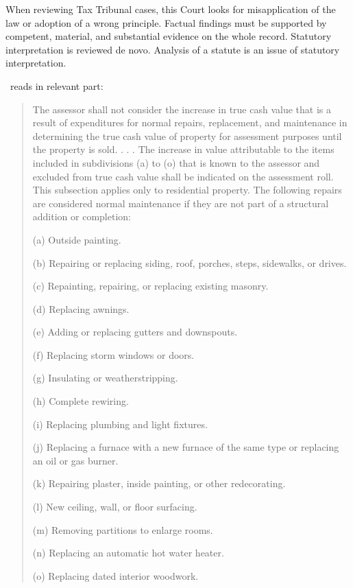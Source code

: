 \documentclass[12pt,\documentclassflag]{michiganCourtOfAppealsBrief}
\def\mathieuGast{\pincite[l]{MCL}{211.27(2)}}
\begin{document}
When reviewing Tax Tribunal cases, this Court looks for misapplication of the law or adoption of a wrong principle. Factual findings must be supported by competent, material, and substantial evidence on the whole record. Statutory interpretation is reviewed de novo.  Analysis of a statute is an issue of statutory interpretation.

\mathieuGast\ reads in relevant part:

\begin{quote}
  The assessor shall not consider the increase in true cash value that is a result of expenditures for normal repairs, replacement, and maintenance in determining the true cash value of property for assessment purposes until the property is sold. . . . The increase in value attributable to the items included in subdivisions (a) to (o) that is known to the assessor and excluded from true cash value shall be indicated on the assessment roll. This subsection applies only to residential property. The following repairs are considered normal maintenance if they are not part of a structural addition or completion:

  (a) Outside painting.

  (b) Repairing or replacing siding, roof, porches, steps, sidewalks, or drives.

  (c) Repainting, repairing, or replacing existing masonry.

  (d) Replacing awnings.

  (e) Adding or replacing gutters and downspouts.

  (f) Replacing storm windows or doors.

  (g) Insulating or weatherstripping.

  (h) Complete rewiring.

  (i) Replacing plumbing and light fixtures.

  (j) Replacing a furnace with a new furnace of the same type or replacing an oil or gas burner.

  (k) Repairing plaster, inside painting, or other redecorating.

  (l) New ceiling, wall, or floor surfacing.

  (m) Removing partitions to enlarge rooms.

  (n) Replacing an automatic hot water heater.

  (o) Replacing dated interior woodwork.
\end{quote}
\end{document}
